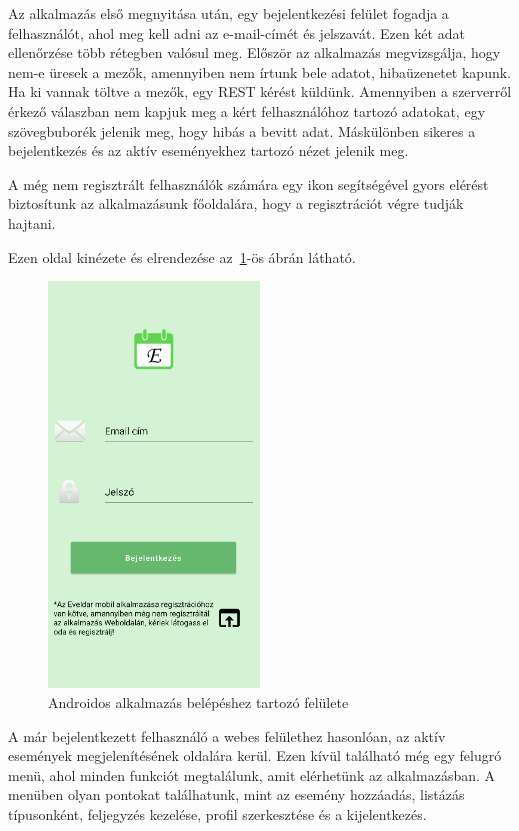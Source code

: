 \documentclass[
]{thesis-ekf}
\theoremstyle{definition}
\theoremstyle{remark}
\begin{document}
	Az alkalmazás első megnyitása után, egy bejelentkezési felület fogadja a felhasználót, ahol meg kell adni az e-mail-címét és jelszavát. Ezen két adat ellenőrzése több rétegben valósul meg. Először az alkalmazás megvizsgálja, hogy nem-e üresek a mezők, amennyiben nem írtunk bele adatot, hibaüzenetet kapunk. Ha ki vannak töltve a mezők, egy REST kérést küldünk. Amennyiben a szerverről érkező válaszban nem kapjuk meg a kért felhasználóhoz tartozó adatokat, egy szövegbuborék jelenik meg, hogy hibás a bevitt adat. Máskülönben sikeres a bejelentkezés és az aktív eseményekhez tartozó nézet jelenik meg.
	
	A még nem regisztrált felhasználók számára egy ikon segítségével gyors elérést biztosítunk az alkalmazásunk főoldalára, hogy a regisztrációt végre tudják hajtani.
	
	Ezen oldal kinézete és elrendezése az~\ref{figure:androidapp_main}-ös ábrán látható.
	
	\begin{figure}[ht!]
		\centering
		\includegraphics[width=0.5\textwidth]{android_app/android_main}
		\caption{Androidos alkalmazás belépéshez tartozó felülete}
		\label{figure:androidapp_main}
	\end{figure}
	
	A már bejelentkezett felhasználó a webes felülethez hasonlóan, az aktív események megjelenítésének oldalára kerül. Ezen kívül található még egy felugró menü, ahol minden funkciót megtalálunk, amit elérhetünk az alkalmazásban. A menüben olyan pontokat találhatunk, mint az esemény hozzáadás, listázás típusonként, feljegyzés kezelése, profil szerkesztése és a kijelentkezés. 
	
\end{document}
